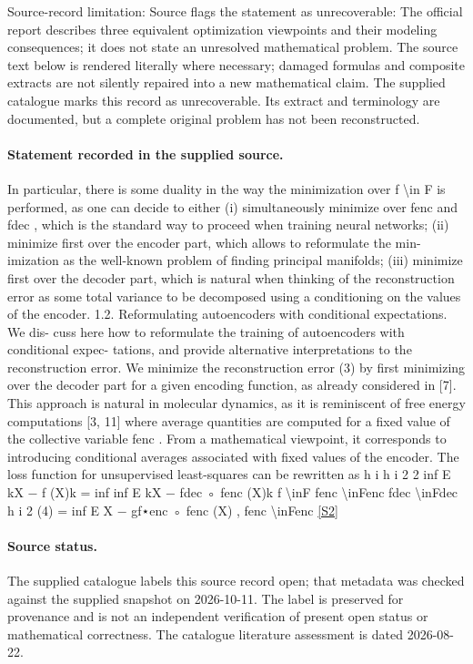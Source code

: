 \documentclass[11pt]{article}
\begin{document}
Source-record limitation: Source flags the statement as unrecoverable: The official report describes three equivalent optimization viewpoints and their modeling consequences; it does not state an unresolved mathematical problem.
The source text below is rendered literally where necessary; damaged formulas and composite extracts are not silently repaired into a new mathematical claim.
The supplied catalogue marks this record as unrecoverable. Its extract and terminology are documented, but a complete original problem has not been reconstructed.
\paragraph{Statement recorded in the supplied source.}
In particular, there is some duality in the way the minimization over f \textbackslash{}in F is performed, as one can decide to either (i) simultaneously minimize over fenc and fdec , which is the standard way to proceed when training neural networks; (ii) minimize first over the encoder part, which allows to reformulate the min- imization as the well-known problem of finding principal manifolds; (iii) minimize first over the decoder part, which is natural when thinking of the reconstruction error as some total variance to be decomposed using a conditioning on the values of the encoder. 1.2. Reformulating autoencoders with conditional expectations. We dis- cuss here how to reformulate the training of autoencoders with conditional expec- tations, and provide alternative interpretations to the reconstruction error. We minimize the reconstruction error (3) by first minimizing over the decoder part for a given encoding function, as already considered in [7]. This approach is natural in molecular dynamics, as it is reminiscent of free energy computations [3, 11] where average quantities are computed for a fixed value of the collective variable fenc . From a mathematical viewpoint, it corresponds to introducing conditional averages associated with fixed values of the encoder. The loss function for unsupervised least-squares can be rewritten as h i h i 2 2 inf E kX − f (X)k = inf inf E kX − fdec ◦ fenc (X)k f \textbackslash{}inF fenc \textbackslash{}inFenc fdec \textbackslash{}inFdec h i 2 (4) = inf E X − gf⋆enc ◦ fenc (X) , fenc \textbackslash{}inFenc \href{https://doi.org/10.4171/owr/2024/26}{[S2]}
\paragraph{Source status.}
The supplied catalogue labels this source record open; that metadata was checked against the supplied snapshot on 2026-10-11. The label is preserved for provenance and is not an independent verification of present open status or mathematical correctness. The catalogue literature assessment is dated 2026-08-22.
\end{document}
